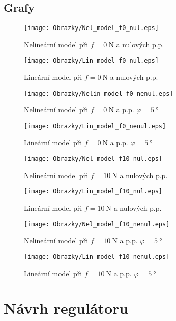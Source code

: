 \documentclass[a4paper, 12pt]{article}
\begin{document}
		\subsection{Grafy}
			\begin{figure}[h]
				\begin{center}
					\texttt{[image: Obrazky/Nel\_model\_f0\_nul.eps]}
					\label{Nel_model_f0_nul}
					\caption{Nelineární model při $f=\SI{0}{\newton}$ a nulových p.p.}
				\end{center}
				\begin{center}
					\texttt{[image: Obrazky/Lin\_model\_f0\_nul.eps]}
					\label{Lin_model_f0_nul}
					\caption{Lineární model při $f=\SI{0}{\newton}$ a nulových p.p.}
				\end{center}
			\end{figure}
			\begin{figure}[h]
				\begin{center}
					\texttt{[image: Obrazky/Nelin\_model\_f0\_nenul.eps]}
					\label{Nel_model_f0_nenul}
					\caption{Nelineární model při $f=\SI{0}{\newton}$ a p.p. $\varphi = \SI{5}{\degree}$}
				\end{center}
				\begin{center}
					\texttt{[image: Obrazky/Lin\_model\_f0\_nenul.eps]}
					\label{Lin_model_f0_nenul}
					\caption{Lineární model při $f=\SI{0}{\newton}$ a p.p. $\varphi = \SI{5}{\degree}$}
				\end{center}
			\end{figure}
			\begin{figure}[h]
				\begin{center}
					\texttt{[image: Obrazky/Nel\_model\_f10\_nul.eps]}
					\label{Nel_model_f10_nul}
					\caption{Nelineární model při $f=\SI{10}{\newton}$ a nulových p.p.}
				\end{center}
				\begin{center}
					\texttt{[image: Obrazky/Lin\_model\_f10\_nul.eps]}
					\label{Lin_model_f10_nul}
					\caption{Lineární model při $f=\SI{10}{\newton}$ a nulových p.p.}
				\end{center}
			\end{figure}
			\begin{figure}[h]
				\begin{center}
					\texttt{[image: Obrazky/Nel\_model\_f10\_nenul.eps]}
					\label{Nel_model_f10_nenul}
					\caption{Nelineární model při $f=\SI{10}{\newton}$ a p.p. $\varphi = \SI{5}{\degree}$}
				\end{center}
				\begin{center}
					\texttt{[image: Obrazky/Lin\_model\_f10\_nenul.eps]}
					\label{Lin_model_f10_nenul}
					\caption{Lineární model při $f=\SI{10}{\newton}$ a p.p. $\varphi = \SI{5}{\degree}$}
				\end{center}
			\end{figure}
	\clearpage
	\section{Návrh regulátoru}
			
\end{document}
